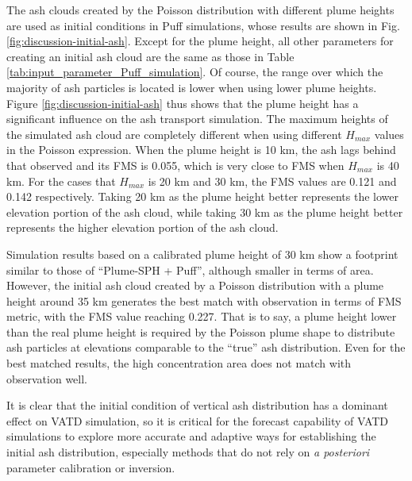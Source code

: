 \documentclass[utf8]{frontiersSCNS} %
\begin{document}
The ash clouds created by the Poisson distribution with different plume heights are used as initial conditions in Puff simulations, whose results are shown in Fig. \ref{fig:discussion-initial-ash}. Except for the plume height, all other parameters for creating an initial ash cloud are the same as those in Table \ref{tab:input_parameter_Puff_simulation}. Of course, the range over which the majority of ash particles is located is lower when using lower plume heights. 
Figure \ref{fig:discussion-initial-ash} thus shows that the plume height has a significant influence on the ash transport simulation. The maximum heights of the simulated ash cloud are completely different when using different $H_{max}$ values in the Poisson expression. When the plume height is 10 km, the ash lags behind that observed and its FMS is 0.055, which is very close to FMS when $H_{max}$ is 40 km. For the cases that  $H_{max}$ is 20 km and 30 km, the FMS values are 0.121 and 0.142 respectively. Taking 20 km as the plume height better represents the lower elevation portion of the ash cloud, while taking 30 km as the plume height better represents the higher elevation portion of the ash cloud.

Simulation results based on a calibrated plume height of 30 km show a footprint similar to those of ``Plume-SPH + Puff'', although smaller in terms of area. However, the initial ash cloud created by a Poisson distribution with a plume height around 35 km generates the best match with observation in terms of FMS metric, with the FMS value reaching 0.227.  That is to say, a plume height lower than the real plume height is required by the Poisson plume shape to distribute ash particles at elevations comparable to the ``true'' ash distribution. Even for the best matched results, the high concentration area does not match with observation well.

It is clear that the initial condition of vertical ash distribution has a dominant effect on VATD simulation, so it is critical for the forecast capability of VATD simulations to explore more accurate and adaptive ways for establishing the initial ash distribution, especially methods that do not rely on \textit{a posteriori} parameter calibration or inversion.
\end{document}
